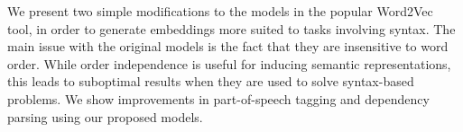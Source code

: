 We present two simple modifications to the models in the popular Word2Vec tool, in order to generate embeddings more suited to tasks involving syntax. The main issue with the original models is the fact that they are insensitive to word order. While order independence is useful for inducing semantic representations, this leads to suboptimal results when they are used to solve syntax-based problems. We show improvements in part-of-speech tagging and dependency parsing using our proposed models.

